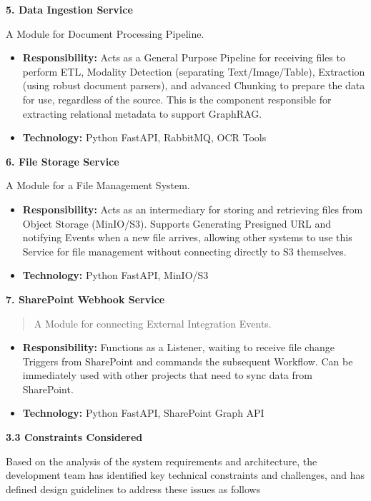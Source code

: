 \documentclass[12pt]{article}
\begin{document}
\textbf{5. Data Ingestion Service}

A Module for Document Processing Pipeline.

\begin{itemize}
\item
  \textbf{Responsibility:} Acts as a General Purpose Pipeline for
  receiving files to perform ETL, Modality Detection (separating
  Text/Image/Table), Extraction (using robust document parsers), and
  advanced Chunking to prepare the data for use, regardless of the
  source. This is the component responsible for extracting relational
  metadata to support GraphRAG.
\item
  \textbf{Technology:} Python FastAPI, RabbitMQ, OCR Tools
\end{itemize}

\textbf{6. File Storage Service}

A Module for a File Management System.

\begin{itemize}
\item
  \textbf{Responsibility:} Acts as an intermediary for storing and
  retrieving files from Object Storage (MinIO/S3). Supports Generating
  Presigned URL and notifying Events when a new file arrives, allowing
  other systems to use this Service for file management without
  connecting directly to S3 themselves.
\item
  \textbf{Technology:} Python FastAPI, MinIO/S3
\end{itemize}

\textbf{7. SharePoint Webhook Service}

\begin{quote}
A Module for connecting External Integration Events.
\end{quote}

\begin{itemize}
\item
  \textbf{Responsibility:} Functions as a Listener, waiting to receive
  file change Triggers from SharePoint and commands the subsequent
  Workflow. Can be immediately used with other projects that need to
  sync data from SharePoint.
\item
  \textbf{Technology:} Python FastAPI, SharePoint Graph API
\end{itemize}

\textbf{3.3 Constraints Considered}

Based on the analysis of the system requirements and architecture, the
development team has identified key technical constraints and
challenges, and has defined design guidelines to address these issues as
follows
\end{document}
